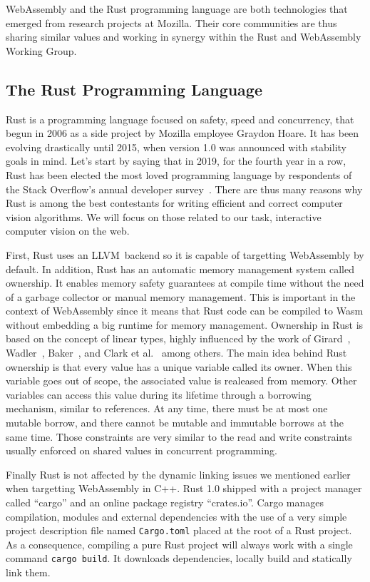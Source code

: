 WebAssembly and the Rust programming language are both technologies
that emerged from research projects at Mozilla.
Their core communities are thus sharing similar values
and working in synergy within the Rust and WebAssembly Working Group.

\subsection{The Rust Programming Language}%
\label{sub:rust_language}

Rust is a programming language focused on safety, speed and concurrency,
that begun in 2006 as a side project by Mozilla employee Graydon Hoare.
It has been evolving drastically until 2015, when version 1.0 was announced
with stability goals in mind.
Let's start by saying that in 2019, for the fourth year in a row,
Rust has been elected the most loved programming language
by respondents of the Stack Overflow's annual developer survey~\cite{rustlovedso}.
There are thus many reasons why Rust is among the best contestants
for writing efficient and correct computer vision algorithms.
We will focus on those related to our task,
interactive computer vision on the web.

First, Rust uses an LLVM backend so it is capable of targetting WebAssembly by default.
In addition, Rust has an automatic memory management system called ownership.
It enables memory safety guarantees at compile time
without the need of a garbage collector or manual memory management.
This is important in the context of WebAssembly since it means that Rust code
can be compiled to Wasm without embedding a big runtime for memory management.
Ownership in Rust is based on the concept of linear types,
highly influenced by the work of Girard~\cite{girard1987linear},
Wadler~\cite{wadler1991there}, Baker~\cite{baker1992lively},
and Clark et al.~\cite{clarke1998ownership} among others.
The main idea behind Rust ownership is that every value has
a unique variable called its owner.
When this variable goes out of scope, the associated value is realeased from memory.
Other variables can access this value during its lifetime
through a borrowing mechanism, similar to references.
At any time, there must be at most one mutable borrow,
and there cannot be mutable and immutable borrows at the same time.
Those constraints are very similar to the read and write constraints
usually enforced on shared values in concurrent programming.

Finally Rust is not affected by the dynamic linking issues
we mentioned earlier when targetting WebAssembly in C++.
Rust 1.0 shipped with a project manager called ``cargo''
and an online package registry ``crates.io''.
Cargo manages compilation, modules and external dependencies
with the use of a very simple project description file named \verb|Cargo.toml|
placed at the root of a Rust project.
As a consequence, compiling a pure Rust project will always work
with a single command \verb|cargo build|.
It downloads dependencies, locally build and statically link them.

